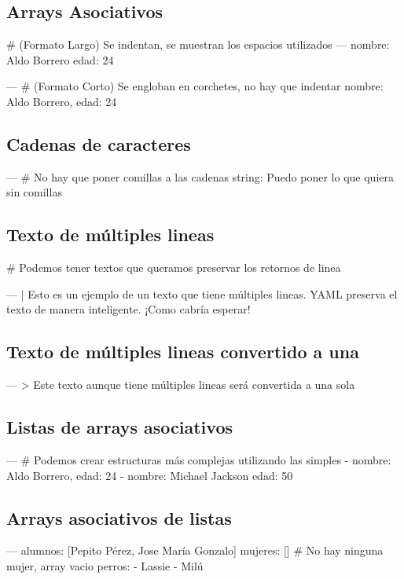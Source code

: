 \subsection{Arrays Asociativos}

\begin{pyglist}[language=yaml]
  # (Formato Largo) Se indentan, se muestran los espacios utilizados
  ---
     nombre: Aldo Borrero
     edad: 24

  --- # (Formato Corto) Se engloban en corchetes, no hay que indentar
   {nombre: Aldo Borrero, edad: 24}
\end{pyglist}

\subsection{Cadenas de caracteres}

\begin{pyglist}[language=yaml]
  --- # No hay que poner comillas a las cadenas
  string: Puedo poner lo que quiera sin comillas
\end{pyglist}

\subsection{Texto de múltiples lineas}

\begin{pyglist}[language=yaml]
  # Podemos tener textos que queramos preservar los retornos de linea

  --- |
   Esto es un ejemplo de un texto
   que tiene múltiples lineas.
       YAML preserva el texto
       de manera inteligente.
   ¡Como cabría esperar!
\end{pyglist}

\subsection{Texto de múltiples lineas convertido a una}

\begin{pyglist}[language=yaml]
  --- >
     Este texto aunque
     tiene múltiples
     lineas
     será convertida a una sola
\end{pyglist}

\subsection{Listas de arrays asociativos}

\begin{pyglist}[language=yaml]
  --- # Podemos crear estructuras más complejas utilizando las simples
  - {nombre: Aldo Borrero, edad: 24}
  - nombre: Michael Jackson
    edad: 50
\end{pyglist}

\subsection{Arrays asociativos de listas}

\begin{pyglist}[language=yaml]
  ---
  alumnos: [Pepito Pérez, Jose María Gonzalo]
  mujeres: [] # No hay ninguna mujer, array vacio
  perros:
    - Lassie
    - Milú
\end{pyglist}